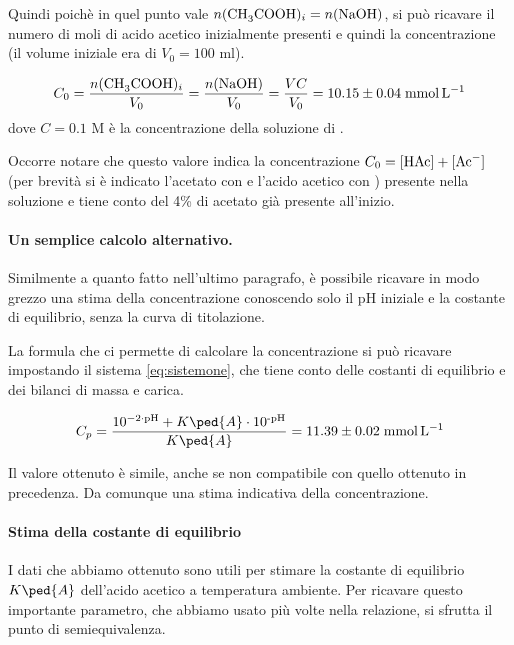 Quindi poichè in quel punto vale $n(\ce{CH3COOH})_i = n(\ce{NaOH})$, si può ricavare il numero di moli di
acido acetico inizialmente presenti e quindi la concentrazione (il volume iniziale era di $V_0 = 100$ ml).

\begin{equation}
    C_0 = \frac{n(\ce{CH3COOH})_i}{V_0} = \frac{n(\ce{NaOH})}{V_0} = \frac{VC}{V_0} = 10.15 \pm 0.04 \; \si{\milli\mol\per\litre}
\end{equation}
%
dove $C = 0.1$ M è la concentrazione della soluzione di .

Occorre notare che questo valore indica la concentrazione $C_0 = \ce{[HAc] + [Ac- ]}$ (per brevità si è indicato l'acetato con  e l'acido acetico con ) presente nella soluzione
e tiene conto del 4\% di acetato già presente all'inizio.

\paragraph{Un semplice calcolo alternativo.}

Similmente a quanto fatto nell'ultimo paragrafo, è possibile ricavare in modo grezzo una stima
della concentrazione conoscendo solo il pH iniziale e la costante di equilibrio, senza
la curva di titolazione.

La formula che ci permette di calcolare la concentrazione si può ricavare impostando il sistema \eqref{eq:sistemone},
che tiene conto delle costanti di equilibrio e dei bilanci di massa e carica.

\begin{equation}
    C_p = \frac{10^{-2 \cdot \text{pH}} + K\ped{A} \cdot 10^\text{-pH}}{K\ped{A}} = 11.39 \pm 0.02 \; \si{\milli\mol\per\litre}
\end{equation}

Il valore ottenuto è simile, anche se non compatibile con quello ottenuto in precedenza. Da comunque una stima indicativa
della concentrazione.

\paragraph{Stima della costante di equilibrio}

I dati che abbiamo ottenuto sono utili per stimare la costante di equilibrio $K\ped{A}$ dell'acido
acetico a temperatura ambiente. Per ricavare questo importante parametro, che abbiamo usato più
volte nella relazione, si sfrutta il punto di semiequivalenza.

